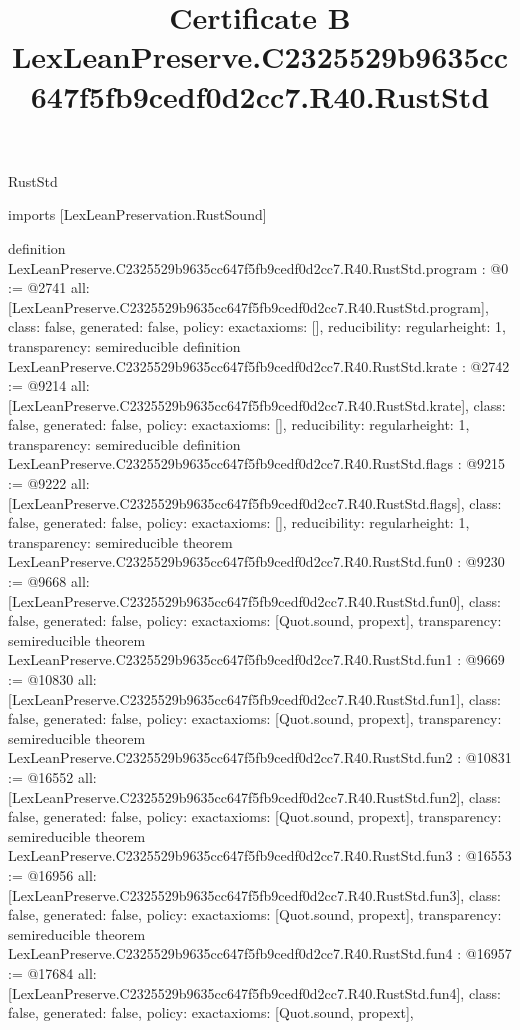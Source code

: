 \begin{lexlean}{RustStd}
\title{Certificate B LexLeanPreserve.C2325529b9635cc647f5fb9cedf0d2cc7.R40.RustStd}
\begin{coremodule}
imports [LexLeanPreservation.RustSound]

definition LexLeanPreserve.C2325529b9635cc647f5fb9cedf0d2cc7.R40.RustStd.program : @0 := @2741 {
  all: [LexLeanPreserve.C2325529b9635cc647f5fb9cedf0d2cc7.R40.RustStd.program],
  class: false,
  generated: false,
  policy: exact{axioms: []},
  reducibility: regular{height: 1},
  transparency: semireducible
}
definition LexLeanPreserve.C2325529b9635cc647f5fb9cedf0d2cc7.R40.RustStd.krate : @2742 := @9214 {
  all: [LexLeanPreserve.C2325529b9635cc647f5fb9cedf0d2cc7.R40.RustStd.krate],
  class: false,
  generated: false,
  policy: exact{axioms: []},
  reducibility: regular{height: 1},
  transparency: semireducible
}
definition LexLeanPreserve.C2325529b9635cc647f5fb9cedf0d2cc7.R40.RustStd.flags : @9215 := @9222 {
  all: [LexLeanPreserve.C2325529b9635cc647f5fb9cedf0d2cc7.R40.RustStd.flags],
  class: false,
  generated: false,
  policy: exact{axioms: []},
  reducibility: regular{height: 1},
  transparency: semireducible
}
theorem LexLeanPreserve.C2325529b9635cc647f5fb9cedf0d2cc7.R40.RustStd.fun0 : @9230 := @9668 {
  all: [LexLeanPreserve.C2325529b9635cc647f5fb9cedf0d2cc7.R40.RustStd.fun0],
  class: false,
  generated: false,
  policy: exact{axioms: [Quot.sound, propext]},
  transparency: semireducible
}
theorem LexLeanPreserve.C2325529b9635cc647f5fb9cedf0d2cc7.R40.RustStd.fun1 : @9669 := @10830 {
  all: [LexLeanPreserve.C2325529b9635cc647f5fb9cedf0d2cc7.R40.RustStd.fun1],
  class: false,
  generated: false,
  policy: exact{axioms: [Quot.sound, propext]},
  transparency: semireducible
}
theorem LexLeanPreserve.C2325529b9635cc647f5fb9cedf0d2cc7.R40.RustStd.fun2 : @10831 := @16552 {
  all: [LexLeanPreserve.C2325529b9635cc647f5fb9cedf0d2cc7.R40.RustStd.fun2],
  class: false,
  generated: false,
  policy: exact{axioms: [Quot.sound, propext]},
  transparency: semireducible
}
theorem LexLeanPreserve.C2325529b9635cc647f5fb9cedf0d2cc7.R40.RustStd.fun3 : @16553 := @16956 {
  all: [LexLeanPreserve.C2325529b9635cc647f5fb9cedf0d2cc7.R40.RustStd.fun3],
  class: false,
  generated: false,
  policy: exact{axioms: [Quot.sound, propext]},
  transparency: semireducible
}
theorem LexLeanPreserve.C2325529b9635cc647f5fb9cedf0d2cc7.R40.RustStd.fun4 : @16957 := @17684 {
  all: [LexLeanPreserve.C2325529b9635cc647f5fb9cedf0d2cc7.R40.RustStd.fun4],
  class: false,
  generated: false,
  policy: exact{axioms: [Quot.sound, propext]},
}
\end{coremodule}
\end{lexlean}
